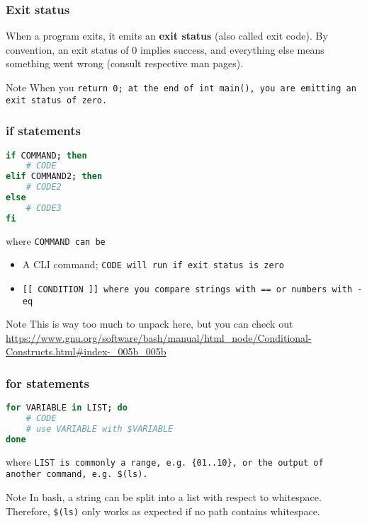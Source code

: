 \begin{frame}
\frametitle{Exit status}
When a program exits, it emits an \textbf{exit status} (also called exit code).
By convention, an exit status of 0 implies success, and everything else means
something went wrong (consult respective man pages).

\begin{block}{Note}
    When you \tt{return 0;} at the end of \tt{int main()}, you are
    emitting an exit status of zero.
\end{block}
\end{frame}

\begin{frame}[fragile]
\frametitle{\textbf{if} statements}
\begin{lstlisting}[language=bash]
if COMMAND; then
    # CODE
elif COMMAND2; then
    # CODE2
else
    # CODE3
fi
\end{lstlisting}
where \tt{COMMAND} can be
\begin{itemize}
    \item A CLI command; \tt{CODE} will run if exit status is zero
    \item \tt{[[ CONDITION ]]} where you compare strings with \tt{==}
        or numbers with \tt{-eq}
\end{itemize}
\begin{block}{Note}
    This is way too much to unpack here, but you can check out
    \url{https://www.gnu.org/software/bash/manual/html_node/Conditional-Constructs.html#index-_005b_005b}
\end{block}
\end{frame}

\begin{frame}[fragile]
\frametitle{\textbf{for} statements}
\begin{lstlisting}[language=bash]
for VARIABLE in LIST; do
    # CODE
    # use VARIABLE with $VARIABLE
done
\end{lstlisting}
where \tt{LIST} is commonly a range, e.g. \verb|{01..10}|, or the output of
another command, e.g. \verb|$(ls)|.
\begin{block}{Note}
    In bash, a string can be split into a list with respect to whitespace.
    Therefore, \verb|$(ls)| only works as expected if no path contains whitespace.
\end{block}
\end{frame}
